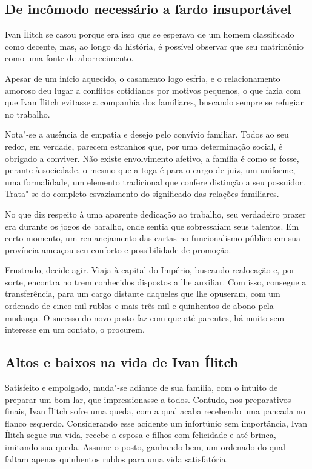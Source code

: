 \documentclass[12pt]{extarticle}
\begin{document}
\subsection{De incômodo necessário a fardo insuportável}

Ivan Ílitch se casou porque era isso que se esperava de um homem
classificado como decente, mas, ao longo da história, é possível observar que seu
matrimônio como uma fonte de aborrecimento.

Apesar de um início aquecido, o casamento logo esfria, e o
relacionamento amoroso deu lugar a conflitos cotidianos por motivos
pequenos, o que fazia com que Ivan Ílitch evitasse a companhia dos
familiares, buscando sempre se refugiar no trabalho.

Nota"-se a ausência de empatia e desejo pelo convívio familiar. Todos
ao seu redor, em verdade, parecem estranhos que, por uma determinação
social, é obrigado a conviver. Não existe envolvimento afetivo, a
família é como se fosse, perante à sociedade, o mesmo que a toga é para
o cargo de juiz, um uniforme, uma formalidade, um elemento tradicional
que confere distinção a seu possuidor. Trata"-se do completo 
esvaziamento do significado das relações
familiares.

No que diz respeito à uma aparente dedicação ao trabalho, seu
verdadeiro prazer era durante os jogos de baralho, onde sentia que 
sobressaíam seus talentos. Em certo momento, um remanejamento 
das cartas no funcionalismo público em sua
província ameaçou seu conforto e possibilidade de promoção.

Frustrado, decide agir. Viaja à capital do Império, buscando realocação
e, por sorte, encontra no trem conhecidos dispostos a lhe auxiliar. Com
isso, consegue a transferência, para um cargo distante daqueles que lhe
opuseram, com um ordenado de cinco mil rublos e mais três mil e
quinhentos de abono pela mudança. O sucesso do novo posto faz 
com que até parentes, há muito sem interesse
em um contato, o procurem.

\subsection{Altos e baixos na vida de Ivan Ílitch}

Satisfeito e empolgado, muda"-se adiante de sua família, com o intuito de
preparar um bom lar, que impressionasse a todos. Contudo, nos 
preparativos finais, Ivan Ílitch sofre uma queda, com a
qual acaba recebendo uma pancada no flanco esquerdo. Considerando esse
acidente um infortúnio sem importância, Ivan Ílitch segue sua vida,
recebe a esposa e filhos com felicidade e até brinca, imitando sua
queda. Assume o posto, ganhando bem, um ordenado do qual faltam apenas
quinhentos rublos para uma vida satisfatória.
\end{document}
